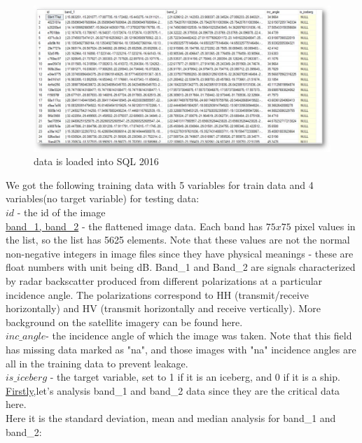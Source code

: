 \documentclass[fleqn,10pt]{SelfArx} %
\begin{document}
\begin{figure}[ht]\centering
\includegraphics[width=\linewidth]{sql}
\caption{data is loaded into SQL 2016}
\label{fig:sql}
\end{figure}
We got the following training data with 5 variables for train data and 4 variables(no target variable) for testing data:\\
\underline{$id$} - the id of the image\\
\underline{band\_1, band\_2} - the flattened image data. Each band has $75x75$ pixel values in the list, so the list has 5625 elements. Note that these values are not the normal non-negative integers in image files since they have physical meanings - these are float numbers with unit being dB. Band\_1 and Band\_2 are signals characterized by radar backscatter produced from different polarizations at a particular incidence angle. The polarizations correspond to HH (transmit/receive horizontally) and HV (transmit horizontally and receive vertically). More background on the satellite imagery can be found here.\\
\underline{$inc\_angle$}- the incidence angle of which the image was taken. Note that this field has missing data marked as "na", and those images with "na" incidence angles are all in the training data to prevent leakage.\\
\underline{$is\_iceberg$} - the target variable, set to 1 if it is an iceberg, and 0 if it is a ship.\\
\underline{Firstly},let's analysis band\_1 and band\_2 data since they are the critical data here. \\
Here it is the standard deviation, mean and median analysis for band\_1 and band\_2:\\
\end{document}
